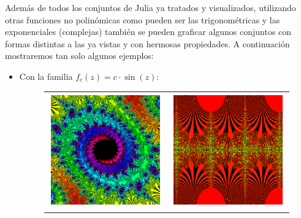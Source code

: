 Además de todos los conjuntos de Julia ya tratados y visualizados, utilizando otras funciones no polinómicas como pueden ser las trigonométricas y las exponenciales (complejas) también se pueden graficar algunos conjuntos con formas distintas a las ya vistas y con hermosas propiedades. A continuación mostraremos tan solo algunos ejemplos:
\newpage
\begin{itemize}
  \item Con la familia $f_c(z)=c\cdot \sin(z)$:
  
\begin{figure}[ht]
  \centering
  \begin{tabular}{cc}
    \includegraphics[scale=0.45]{./img/C3/juliaS-1.png} &   \includegraphics[scale=0.45]{./img/C3/juliaS-2.png}
  \end{tabular}
\end{figure}



\end{itemize}
